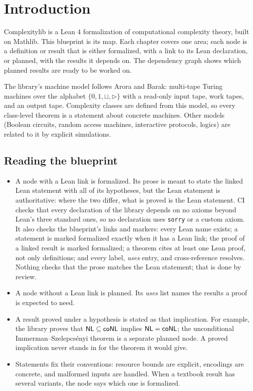 \chapter{Introduction}
\label{chap:intro}

Complexitylib is a Lean 4 formalization of computational complexity theory,
built on Mathlib. This blueprint is its map. Each chapter covers one area; each
node is a definition or result that is either formalized, with a link to its
Lean declaration, or planned, with the results it depends on. The dependency
graph shows which planned results are ready to be worked on.

The library's machine model follows Arora and Barak: multi-tape Turing machines
over the alphabet $\{0, 1, \sqcup, \triangleright\}$ with a read-only input
tape, work tapes, and an output tape. Complexity classes are defined from this
model, so every class-level theorem is a statement about concrete machines.
Other models (Boolean circuits, random access machines, interactive protocols,
logics) are related to it by explicit simulations.

\section{Reading the blueprint}

\begin{itemize}
  \item A node with a Lean link is formalized. Its prose is meant to state the
    linked Lean statement with all of its hypotheses, but the Lean statement is
    authoritative: where the two differ, what is proved is the Lean statement.
    CI checks that every declaration of the library depends on no axioms
    beyond Lean's three standard ones, so no declaration uses \texttt{sorry}
    or a custom axiom. It also checks the blueprint's links and markers: every
    Lean name exists; a statement is marked formalized exactly when it has a
    Lean link; the proof of a linked result is marked formalized; a theorem
    cites at least one Lean proof, not only definitions; and every label,
    \emph{uses} entry, and cross-reference resolves. Nothing checks that the
    prose matches the Lean statement; that is done by review.
  \item A node without a Lean link is planned. Its \emph{uses} list names the
    results a proof is expected to need.
  \item A result proved under a hypothesis is stated as that implication. For
    example, the library proves that $\mathsf{NL} \subseteq \mathsf{coNL}$ implies
    $\mathsf{NL} = \mathsf{coNL}$; the unconditional Immerman--Szelepcs\'enyi theorem is
    a separate planned node. A proved implication never stands in for the
    theorem it would give.
  \item Statements fix their conventions: resource bounds are explicit,
    encodings are concrete, and malformed inputs are handled. When a textbook
    result has several variants, the node says which one is formalized.
\end{itemize}

